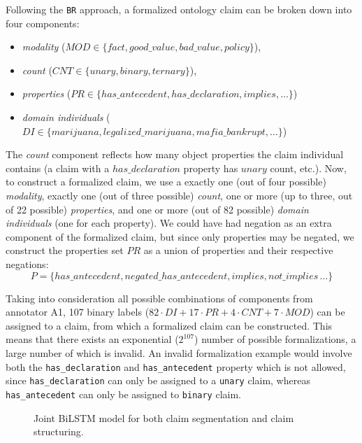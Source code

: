 Following the \texttt{BR} approach, a formalized ontology claim can be broken
down into four components:
\begin{itemize}
	\item \emph{modality} ($\mathit{MOD} \in \{\mathit{fact},
		\mathit{good\_value}, \mathit{bad\_value}, \mathit{policy}\}$), 
	\item \emph{count} ($\mathit{CNT} \in \{\mathit{unary},
		\mathit{binary},  \mathit{ternary}\}$),
	\item \emph{properties} ($\mathit{PR} \in \{\mathit{has\_antecedent},
		\mathit{has\_declaration}, \mathit{implies}, \dots\}$)
	\item \emph{domain individuals} ($\mathit{DI} \in \{\mathit{marijuana},
		\mathit{legalized\_marijuana}, \mathit{mafia\_bankrupt},
		\dots\}$)
\end{itemize}
The \emph{count} component reflects how many object properties the claim individual
contains (a claim with a $\mathit{has\_declaration}$ property has $\mathit{unary}$ count, etc.).
Now, to construct a formalized claim, we use a exactly one (out of four
possible) \emph{modality}, exactly one (out of three possible) \emph{count},
one or more (up to three, out of 22 possible) \emph{properties}, and one
or more (out of 82 possible) \emph{domain individuals} (one for each property). 
We could have had negation as an extra component of the formalized claim, but
since only properties may be negated, we construct the properties set $PR$ as a
union of properties and their respective negations: 
$$
P = \{\mathit{has\_antecedent}, 
\mathit{negated\_has\_antecedent}, \mathit{implies}, \mathit{not\_implies}\, \dots\}
$$

Taking into consideration all possible combinations of components from
annotator A1, 107 binary labels ($82 \cdot \mathit{DI} + 17 \cdot \mathit{PR} + 4\cdot
\mathit{CNT} + 7 \cdot \mathit{MOD}$) can be assigned to a claim, from which a
formalized claim can be constructed.  This means that there  exists an
exponential ($2^{107}$) number of possible formalizations, a large number of
which is invalid.  An invalid formalization example would involve both the
\texttt{has\_declaration} and \texttt{has\_antecedent} property which is not allowed,
since \texttt{has\_declaration} can only be assigned to a \texttt{unary} claim,
whereas \texttt{has\_antecedent} can only be assigned to \texttt{binary} claim. 

\begin{figure}
	
	\caption{Joint BiLSTM model for both claim segmentation and claim 
	structuring. }
	\label{fig:joint_model}
\end{figure}

